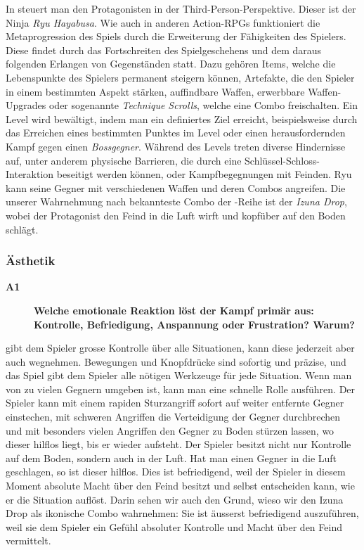 \documentclass[../Main.tex]{subfiles}
\begin{document}
In  steuert man den Protagonisten in der Third-Person-Perspektive. Dieser ist der Ninja \textit{Ryu Hayabusa}. Wie auch in anderen Action-RPGs funktioniert die Metaprogression des Spiels durch die Erweiterung der Fähigkeiten des Spielers. Diese findet durch das Fortschreiten des Spielgeschehens und dem daraus folgenden Erlangen von Gegenständen statt. Dazu gehören Items, welche die Lebenspunkte des Spielers permanent steigern können, Artefakte, die den Spieler in einem bestimmten Aspekt stärken, auffindbare Waffen, erwerbbare Waffen-Upgrades oder sogenannte \textit{Technique Scrolls}, welche eine Combo freischalten. Ein Level wird bewältigt, indem man ein definiertes Ziel erreicht, beispielsweise durch das Erreichen eines bestimmten Punktes im Level oder einen herausfordernden Kampf gegen einen \textit{Bossgegner}. Während des Levels treten diverse Hindernisse auf, unter anderem physische Barrieren, die durch eine Schlüssel-Schloss-Interaktion beseitigt werden können, oder Kampfbegegnungen mit Feinden. Ryu kann seine Gegner mit verschiedenen Waffen und deren Combos angreifen. Die unserer Wahrnehmung nach bekannteste Combo der -Reihe ist der \textit{Izuna Drop}, wobei der Protagonist den Feind in die Luft wirft und kopfüber auf den Boden schlägt.

\subsubsection{Ästhetik}

\begin{description}
    \item[\textbf{A1}] \textbf{Welche emotionale Reaktion löst der Kampf primär aus: Kontrolle, Befriedigung, Anspannung oder Frustration? Warum?}
\end{description}

 gibt dem Spieler grosse Kontrolle über alle Situationen, kann diese jederzeit aber auch wegnehmen. Bewegungen und Knopfdrücke sind sofortig und präzise, und das Spiel gibt dem Spieler alle nötigen Werkzeuge für jede Situation. Wenn man von zu vielen Gegnern umgeben ist, kann man eine schnelle Rolle ausführen. Der Spieler kann mit einem rapiden Sturzangriff sofort auf weiter entfernte Gegner einstechen, mit schweren Angriffen die Verteidigung der Gegner durchbrechen und mit besonders vielen Angriffen den Gegner zu Boden stürzen lassen, wo dieser hilflos liegt, bis er wieder aufsteht. Der Spieler besitzt nicht nur Kontrolle auf dem Boden, sondern auch in der Luft. Hat man einen Gegner in die Luft geschlagen, so ist dieser hilflos. Dies ist befriedigend, weil der Spieler in diesem Moment absolute Macht über den Feind besitzt und selbst entscheiden kann, wie er die Situation auflöst. Darin sehen wir auch den Grund, wieso wir den Izuna Drop als ikonische Combo wahrnehmen: Sie ist äusserst befriedigend auszuführen, weil sie dem Spieler ein Gefühl absoluter Kontrolle und Macht über den Feind vermittelt.
\end{document}
